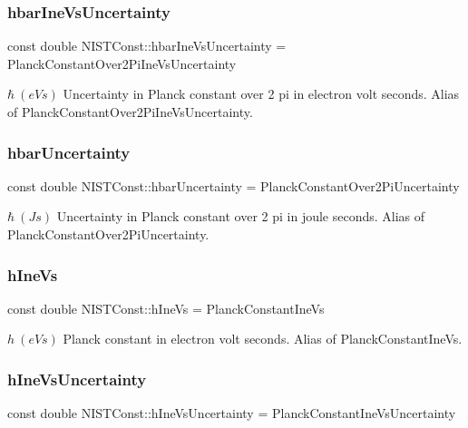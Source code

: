 \subsubsection{\texorpdfstring{hbar\+Ine\+Vs\+Uncertainty}{hbarIneVsUncertainty}}
{\footnotesize\ttfamily const double N\+I\+S\+T\+Const\+::hbar\+Ine\+Vs\+Uncertainty = Planck\+Constant\+Over2\+Pi\+Ine\+Vs\+Uncertainty}

$\hbar \ (eV s)$ Uncertainty in Planck constant over 2 pi in electron volt seconds. Alias of Planck\+Constant\+Over2\+Pi\+Ine\+Vs\+Uncertainty. \mbox{\label{group___n_i_s_t_const-_planck_constant_ga2f2785d3e09a94615ed207e936f73f74}} 
\subsubsection{\texorpdfstring{hbar\+Uncertainty}{hbarUncertainty}}
{\footnotesize\ttfamily const double N\+I\+S\+T\+Const\+::hbar\+Uncertainty = Planck\+Constant\+Over2\+Pi\+Uncertainty}

$\hbar \ (J s)$ Uncertainty in Planck constant over 2 pi in joule seconds. Alias of Planck\+Constant\+Over2\+Pi\+Uncertainty. \mbox{\label{group___n_i_s_t_const-_planck_constant_gabdd6f21b3e5325e4df4a021ee6b6a506}} 
\subsubsection{\texorpdfstring{h\+Ine\+Vs}{hIneVs}}
{\footnotesize\ttfamily const double N\+I\+S\+T\+Const\+::h\+Ine\+Vs = Planck\+Constant\+Ine\+Vs}

$h \ (eV s)$ Planck constant in electron volt seconds. Alias of Planck\+Constant\+Ine\+Vs. \mbox{\label{group___n_i_s_t_const-_planck_constant_gadbf2b61fe6b0389e003a788047ad0c43}} 
\subsubsection{\texorpdfstring{h\+Ine\+Vs\+Uncertainty}{hIneVsUncertainty}}
{\footnotesize\ttfamily const double N\+I\+S\+T\+Const\+::h\+Ine\+Vs\+Uncertainty = Planck\+Constant\+Ine\+Vs\+Uncertainty}

